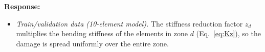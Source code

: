 \documentclass[11pt]{article}
\newenvironment{response}{\par\smallskip\noindent\color{resp}\textbf{Response:}\ }{\par}
\newcommand{\z}{\mathbf{z}}
\begin{document}
\begin{response}
\begin{itemize}[leftmargin=*]
\item \emph{Train/validation data (10-element model).} The stiffness reduction factor $z_d$ multiplies the bending stiffness of the elements in zone $d$ (Eq.~\eqref{eq:Kz}), so the damage is spread uniformly over the entire zone. 


\end{itemize}
\end{response}
\end{document}
